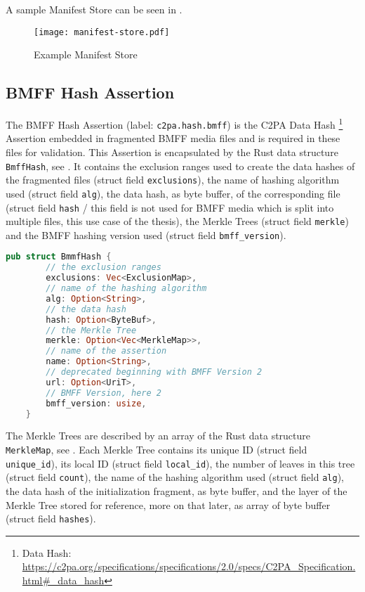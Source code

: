 A sample Manifest Store can be seen in .

\begin{figure}
    \centering
    \texttt{[image: manifest-store.pdf]}
    \caption{Example Manifest Store \cite{manifestStore}}
    \label{fig:manifest_store}
\end{figure}

\subsection{BMFF Hash Assertion\label{sec:bmff_assertion}}

The BMFF Hash Assertion (label: \texttt{c2pa.hash.bmff}) is the C2PA Data Hash \footnote{Data Hash: \url{https://c2pa.org/specifications/specifications/2.0/specs/C2PA_Specification.html\#_data_hash}} Assertion embedded in fragmented BMFF media files and is required in these files for validation. This Assertion is encapsulated by the Rust data structure \texttt{BmffHash}, see . It contains the exclusion ranges used to create the data hashes of the fragmented files (struct field \texttt{exclusions}), the name of hashing algorithm used (struct field \texttt{alg}), the data hash, as byte buffer, of the corresponding file (struct field \texttt{hash} / this field is not used for BMFF media which is split into multiple files, this use case of the thesis), the Merkle Trees (struct field \texttt{merkle}) and the BMFF hashing version used (struct field \texttt{bmff\_version}).

\begin{minipage}{0.95\linewidth}
\begin{lstlisting}[caption={BmffHash Rust Definition}, label=code:bmff_hash, language=Rust, captionpos=b]
    pub struct BmmfHash {
        // the exclusion ranges
        exclusions: Vec<ExclusionMap>,
        // name of the hashing algorithm
        alg: Option<String>,
        // the data hash
        hash: Option<ByteBuf>,
        // the Merkle Tree
        merkle: Option<Vec<MerkleMap>>,
        // name of the assertion
        name: Option<String>,
        // deprecated beginning with BMFF Version 2
        url: Option<UriT>,
        // BMFF Version, here 2
        bmff_version: usize,
    }
\end{lstlisting}
\end{minipage}

The Merkle Trees are described by an array of the Rust data structure \texttt{MerkleMap}, see . Each Merkle Tree contains its unique ID (struct field \texttt{unique\_id}), its local ID (struct field \texttt{local\_id}), the number of leaves in this tree (struct field \texttt{count}), the name of the hashing algorithm used (struct field \texttt{alg}), the data hash of the initialization fragment, as byte buffer, and the layer of the Merkle Tree stored for reference, more on that later, as array of byte buffer (struct field \texttt{hashes}).


